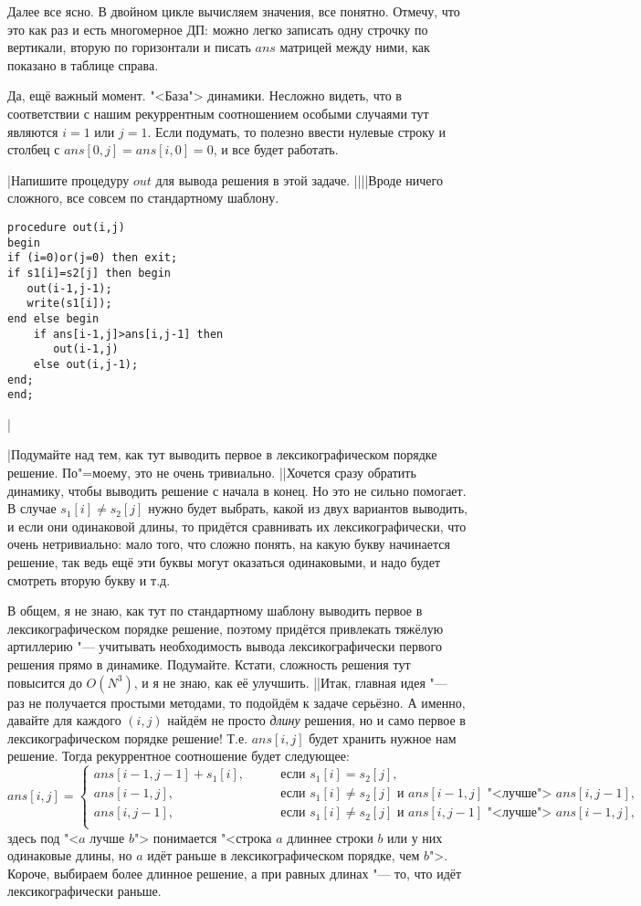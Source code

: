 Далее все ясно. В двойном цикле вычисляем значения, все понятно. Отмечу, что это как раз и есть 
многомерное ДП: можно легко записать одну строчку по вертикали, вторую по горизонтали и писать 
$ans$ матрицей между ними, как показано в таблице справа.

Да, ещё важный момент. "<База"> динамики. Несложно видеть, что в соответствии с нашим рекуррентным 
соотношением особыми случаями тут являются $i=1$ или $j=1$. Если подумать, то полезно ввести 
нулевые строку и столбец с $ans[0,j]=ans[i,0]=0$, и все будет работать.

\task|Напишите процедуру $out$ для вывода решения в этой задаче.
||||Вроде ничего сложного, все совсем по стандартному шаблону.
\begin{codesampleo}\begin{verbatim}
procedure out(i,j)
begin
if (i=0)or(j=0) then exit;
if s1[i]=s2[j] then begin
   out(i-1,j-1);
   write(s1[i]);
end else begin
    if ans[i-1,j]>ans[i,j-1] then
       out(i-1,j)
    else out(i,j-1);
end;
end;
\end{verbatim}\end{codesampleo}
|

\task|Подумайте над тем, как тут выводить первое в лексикографическом порядке 
решение. По"=моему, это не очень тривиально.
||Хочется сразу обратить динамику, чтобы выводить решение с начала в конец. Но это не сильно 
помогает. В случае $s_1[i]\neq s_2[j]$ нужно будет выбрать, какой из двух вариантов выводить, и 
если они одинаковой длины, то придётся сравнивать их лексикографически, что очень нетривиально: 
мало того, что сложно понять, на какую букву начинается решение, так ведь ещё эти буквы могут 
оказаться одинаковыми, и надо будет смотреть вторую букву и т.д.

В общем, я не знаю, как тут по стандартному шаблону выводить первое в лексикографическом порядке 
решение, поэтому придётся привлекать тяжёлую артиллерию "--- учитывать необходимость вывода 
лексикографически первого решения прямо в динамике. Подумайте. Кстати, сложность решения тут 
повысится до $O(N^3)$, и я не знаю, как её улучшить.
||Итак, главная идея "--- раз не получается простыми методами, то подойдём к задаче серьёзно. А 
именно, давайте для каждого $(i,j)$ найдём не просто \textit{длину} решения, но и само первое в 
лексикографическом порядке решение! Т.е. $ans[i,j]$ будет хранить нужное нам решение. Тогда 
рекуррентное соотношение будет следующее:
$$
ans[i,j]=\left\{\begin{array}{ll}
ans[i-1,j-1]+s_1[i],\qquad&\mbox{если }s_1[i]=s_2[j],\\
ans[i-1,j],\qquad&\mbox{если $s_1[i]\neq s_2[j]$ и $ans[i-1,j]$ "<лучше"> $ans[i,j-1]$},\\
ans[i,j-1],\qquad&\mbox{если $s_1[i]\neq s_2[j]$ и $ans[i,j-1]$ "<лучше"> $ans[i-1,j]$},\\
\end{array}\right.
$$
здесь под "<$a$ лучше $b$"> понимается "<строка $a$ длиннее строки $b$ или у них одинаковые длины, 
но $a$ идёт раньше в лексикографическом порядке, чем $b$">. Короче, выбираем более длинное решение, 
а при равных длинах "--- то, что идёт лексикографически раньше.

